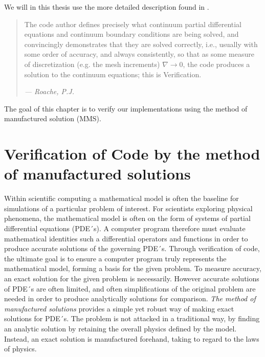 
We will in this thesis use the more detailed  description found in \cite{Roache}.

\begin{quote}
The code author defines precisely what continuum partial differential equations and continuum boundary conditions are being solved, and convincingly demonstrates that they are solved correctly, i.e., usually with some order of accuracy, and always consistently, so that as some measure of discretization (e.g. the mesh increments) $\nabla \rightarrow 0$, the code produces a solution to the continuum equations; this is Verification.
\begin{flushright}
\textit{--- Roache, P.J.}
\end{flushright}
\end{quote}
 


The goal of this chapter is to verify our implementations using the method of manufactured solution  (MMS).

\section{Verification of Code by the method of manufactured solutions}
Within scientific computing a mathematical model is often the baseline for simulations of a particular problem of interest. For scientists exploring physical phenomena, the mathematical model is often on the form of systems of partial differential equations (PDE´s). A computer program therefore must evaluate  mathematical identities such a differential operators and functions in order to produce accurate solutions of the governing PDE´s. 
Through verification of code, the ultimate goal is to ensure a computer program truly represents the mathematical model, forming a basis for the given problem. 
To measure accuracy, an exact solution for the given problem is necessarily. However accurate solutions of PDE´s are often limited, and often simplifications of the original problem are needed in order to produce analytically solutions for comparison. \textit{The method of manufactured solutions} provides a simple yet robust way of making exact solutions for PDE´s. The problem is not attacked in a traditional way, by finding an analytic solution by retaining the overall physics defined by the model. Instead, an exact solution is manufactured forehand, taking to regard to the laws of physics. 

